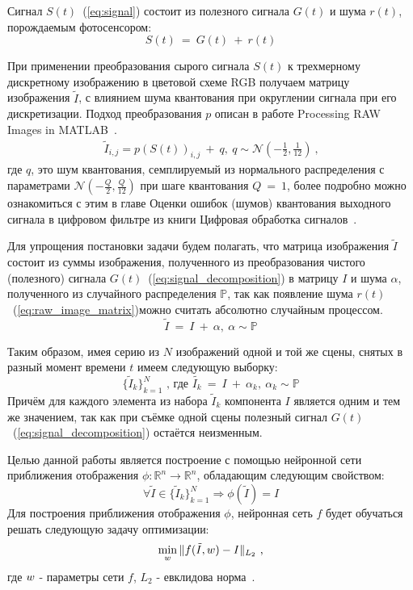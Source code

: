 Сигнал $S(t)$~(\ref{eq:signal}) состоит из полезного сигнала $G(t)$ и шума $r(t)$, порождаемым фотосенсором:
\begin{equation}\label{eq:signal_decomposition}
S(t)\ =\ G(t)\ +\ r(t)
\end{equation}

При применении преобразования сырого сигнала $S(t)$ к трехмерному дискретному изображению в цветовой схеме RGB получаем матрицу изображения  $\tilde{I}$, с влиянием шума квантования при округлении сигнала при его дискретизации. Подход преобразования $p$ описан в работе Processing RAW Images in MATLAB~\autocite{RAWtoRGB}.
\begin{eqnarray}\label{eq:raw_image_matrix}
\tilde{I}_{i,j} = p(S(t))_{i, j}\ +\ q,\ q  \sim \mathcal{N}(-\frac{1}{2}, \frac{1}{12})\ \text{,}
\end{eqnarray}
где $q$, это шум квантования, семплируемый из нормального распределения с параметрами $\mathcal{N}(-\frac{Q}{2}, \frac{Q}{12})$ при шаге квантования $Q\ =\ 1$, более подробно можно ознакомиться с этим в главе Оценки ошибок (шумов) квантования выходного сигнала в цифровом фильтре из книги Цифровая обработка сигналов~\autocite{DSP}.

Для упрощения постановки задачи будем полагать, что матрица изображения $\tilde{I}$ состоит из суммы изображения, полученного из преобразования чистого (полезного) сигнала $G(t)$~(\ref{eq:signal_decomposition}) в матрицу $I$ и шума $\alpha$, полученного из случайного распределения $\mathbb{P}$, так как появление шума $r(t)$~(\ref{eq:raw_image_matrix})можно считать абсолютно случайным процессом.
\begin{equation}\label{eq:matrix_def}
\tilde{I}\ =\ I\ +\ \alpha,\ \alpha \sim \mathbb{P}
\end{equation}

Таким образом, имея серию из $N$ изображений одной и той же сцены, снятых в разный момент времени $t$ имеем следующую выборку:
\begin{equation}\label{eq:collection}
\{\tilde{I}_k\}_{k=1}^{N}\text{ , где }\tilde{I_k}\ =\  I\ +\ \alpha_k,\ \alpha_k \sim \mathbb{P}
\end{equation}
Причём для каждого элемента из набора $\tilde{I}_k$ компонента $I$ является одним и тем же значением, так как при съёмке одной сцены полезный сигнал $G(t)$~(\ref{eq:signal_decomposition}) остаётся неизменным.

Целью данной работы является построение с помощью нейронной сети приближения отображения $\phi: \mathbb{R}^n \longrightarrow \mathbb{R}^n$, обладающим следующим свойством:
\begin{equation}\label{eq:main_property}
\forall \tilde{I} \in \{\tilde{I}_k\}_{k=1}^{N} \Longrightarrow \phi(\tilde{I}) = I 
\end{equation}
Для построения приближения отображения $\phi$, нейронная сеть $f$ будет обучаться решать следующую задачу оптимизации:
\begin{eqnarray}\label{eq:main_min_task}
\min_{\mathnormal{w}} \Arrowvert f(\tilde{I}, \mathnormal{w}) - I \Arrowvert_{L_2}\text{ ,}
\end{eqnarray}
где $\mathnormal{w}$ - параметры сети $f$, $L_2$ - евклидова норма~\autocite{Haykin}.


